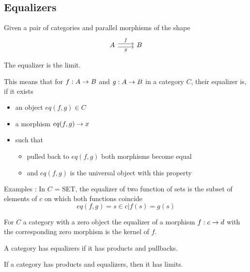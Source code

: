 \documentclass[../../notes.tex]{subfiles}
\begin{document}
\subsection{Equalizers}

\begin{definition}

  Given a pair of categories and parallel morphisms of the shape
  \[
  \begin{tikzcd}
    A \arrow[r, shift left, "f"] \arrow[r, shift right, swap, "g"]& B 
  \end{tikzcd}
\]

The equalizer is the limit. 
  
\end{definition}

This means that for $f : A \rightarrow B$ and $g : A \rightarrow B$ in a category $C$,
their equalizer is, if it exists
\begin{itemize}
\item an object $eq(f,g) \in C$
\item a morphism $eq(f,g) \rightarrow x$
\item such that
  \begin{itemize}
  \item pulled back to $eq(f,g)$ both morphisms become equal
  \item and $eq(f,g)$ is the universal object with this property
  \end{itemize}
\end{itemize}

Examples :
In $C$ = SET, the equalizer of two function of sets is the subset of
elements of $c$ on which both functions coincide
\[ eq(f,g) = {s \in c | f(s) = g(s)} \] 

For $C$ a category with a zero object the equalizer of a morphism
$f : c \rightarrow d$ with the corresponding zero morphism is the kernel of $f$.

\begin{proposition}

  A category has equalizers if it has products and pullbacks.
  
\end{proposition}

\begin{proposition}

  If a category has products and equalizers, then it has limits.
  
\end{proposition}
\end{document}
